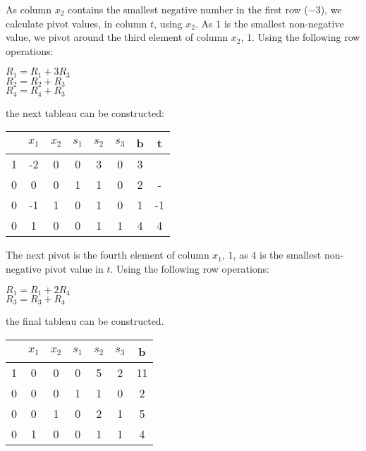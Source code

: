 \documentclass[11pt]{article} %
\begin{document}
As column $x_2$ contains the smallest negative number in the first row ($-3$), we calculate pivot values, in column $t$, using $x_2$. As $1$ is the smallest non-negative value, we pivot around the third element of column $x_2$, $1$. Using the following row operations:

\begin{center}

$R_1 = R_1 + 3R_3$ \\
$R_2 = R_2 + R_3$ \\
$R_4 = R_4 + R_3$ \\

\end{center}

the next tableau can be constructed:

\begin{center}

\begin{tabular}{ c | c c c c c | c | c }
    & $x_1$ & $x_2$ & $s_1$ & $s_2$ & $s_3$ & b & t \\ \hline
  1 & -2 & 0 & 0 & 3 & 0 & 3 & \\  \hline
  0 & 0 & 0 & 1 & 1 & 0 & 2 & -\\
  0 & -1 & 1 & 0 & 1 & 0 & 1 &-1\\
  0 & 1 & 0 & 0 & 1 & 1 & 4 & 4\\
\end{tabular}

\end{center}

The next pivot is the fourth element of column $x_1$, $1$, as $4$ is the smallest non-negative pivot value in $t$.  Using the following row operations:

\begin{center}

$R_1 = R_1 + 2R_4$ \\
$R_3 = R_3 + R_4$ \\

\end{center}

the final tableau can be constructed.

\begin{center}

\begin{tabular}{ c | c c c c c | c  }
    & $x_1$ & $x_2$ & $s_1$ & $s_2$ & $s_3$ & b\\ \hline
  1 & 0 & 0 & 0 & 5 & 2 & 11 \\  \hline
  0 & 0 & 0 & 1 & 1 & 0 & 2\\
  0 & 0 & 1 & 0 & 2 & 1 & 5\\
  0 & 1 & 0 & 0 & 1 & 1 & 4\\
\end{tabular}

\end{center}
\end{document}
